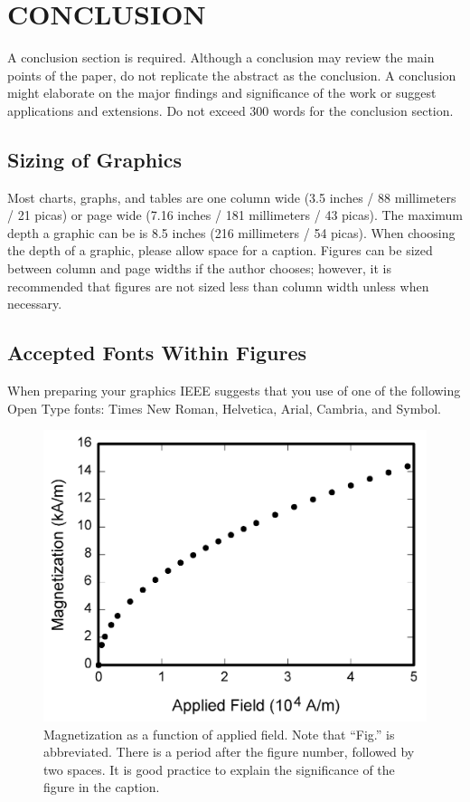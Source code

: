 \section{CONCLUSION}
A conclusion section is required. Although a conclusion may review the main points of the paper, do not replicate the abstract as the conclusion. A conclusion might elaborate on the major findings and significance of the work or suggest applications and extensions. Do not exceed 300 words for the conclusion section.

\subsection{Sizing of Graphics}
Most charts, graphs, and tables are one column wide (3.5 inches / 88 millimeters / 21 picas) or page wide (7.16 inches / 181 millimeters / 43 picas). The maximum depth a graphic can be is 8.5 inches (216 millimeters / 54 picas). When choosing the depth of a graphic, please allow space for a caption. Figures can be sized between column and page widths if the author chooses; however, it is recommended that figures are not sized less than column width unless when necessary. 

\subsection{Accepted Fonts Within Figures}
When preparing your graphics IEEE suggests that you use of one of the following Open Type fonts: Times New Roman, Helvetica, Arial, Cambria, and Symbol.

\begin{figure}[t]
	\centering
	\includegraphics[width=\linewidth]{./fig1.png}
	\caption{Magnetization as a function of applied field. Note that “Fig.” is abbreviated. There is a period after the figure number, followed by two spaces. It is good practice to explain the significance of the figure in the caption.}
	\label{fig:examplesinglefig}
\end{figure}


